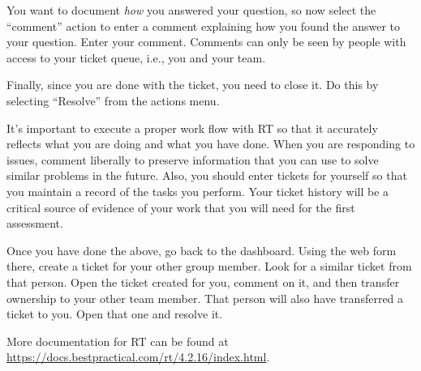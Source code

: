 \documentclass{article}
\begin{document}
You want to document \emph{how} you answered your question, so now select the ``comment'' action to enter a comment explaining how you found the answer to your question. Enter your comment. Comments can only be seen by people with access to your ticket queue, i.e., you and your team.

Finally, since you are done with the ticket, you need to close it. Do this by selecting ``Resolve'' from the actions menu. 

It's important to execute a proper work flow with RT so that it accurately reflects what you are doing and what you have done. When you are responding to issues, comment liberally to preserve information that you can use to solve similar problems in the future. Also, you should enter tickets for yourself so that you maintain a record of the tasks you perform. Your ticket history will be a critical source of evidence of your work that you will need for the first assessment.

Once you have done the above, go back to the dashboard. Using the web form there, create a ticket for your other group member. Look for a similar ticket from that person. Open the ticket created for you, comment on it, and then transfer ownership to your other team member. That person will also have transferred a ticket to you. Open that one and resolve it.

More documentation for RT can be found at \url{https://docs.bestpractical.com/rt/4.2.16/index.html}.
\end{document}
